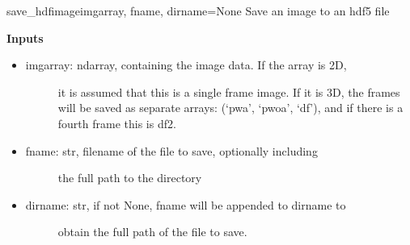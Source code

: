 \documentclass[letterpaper,10pt,english]{manual}
\begin{document}
\hypertarget{odysseus.imageio.save_hdfimage}{}\begin{funcdesc}{save\_hdfimage}{imgarray, fname, dirname=None}
Save an image to an hdf5 file

\textbf{Inputs}
\begin{itemize}
\item {} \begin{description}
\item[imgarray: ndarray, containing the image data. If the array is 2D,] \leavevmode
it is assumed that this is a single frame image. If it is
3D, the frames will be saved as separate arrays:
(`pwa', `pwoa', `df'), and if there is a fourth frame this
is df2.

\end{description}

\item {} \begin{description}
\item[fname: str, filename of the file to save, optionally including] \leavevmode
the full path to the directory

\end{description}

\item {} \begin{description}
\item[dirname: str, if not None, fname will be appended to dirname to] \leavevmode
obtain the full path of the file to save.

\end{description}

\end{itemize}
\end{funcdesc}
\end{document}
